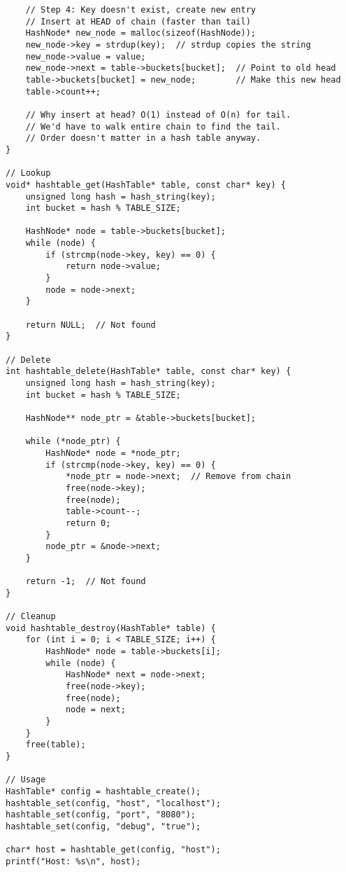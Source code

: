 \begin{lstlisting}
    // Step 4: Key doesn't exist, create new entry
    // Insert at HEAD of chain (faster than tail)
    HashNode* new_node = malloc(sizeof(HashNode));
    new_node->key = strdup(key);  // strdup copies the string
    new_node->value = value;
    new_node->next = table->buckets[bucket];  // Point to old head
    table->buckets[bucket] = new_node;        // Make this new head
    table->count++;

    // Why insert at head? O(1) instead of O(n) for tail.
    // We'd have to walk entire chain to find the tail.
    // Order doesn't matter in a hash table anyway.
}

// Lookup
void* hashtable_get(HashTable* table, const char* key) {
    unsigned long hash = hash_string(key);
    int bucket = hash % TABLE_SIZE;

    HashNode* node = table->buckets[bucket];
    while (node) {
        if (strcmp(node->key, key) == 0) {
            return node->value;
        }
        node = node->next;
    }

    return NULL;  // Not found
}

// Delete
int hashtable_delete(HashTable* table, const char* key) {
    unsigned long hash = hash_string(key);
    int bucket = hash % TABLE_SIZE;

    HashNode** node_ptr = &table->buckets[bucket];

    while (*node_ptr) {
        HashNode* node = *node_ptr;
        if (strcmp(node->key, key) == 0) {
            *node_ptr = node->next;  // Remove from chain
            free(node->key);
            free(node);
            table->count--;
            return 0;
        }
        node_ptr = &node->next;
    }

    return -1;  // Not found
}

// Cleanup
void hashtable_destroy(HashTable* table) {
    for (int i = 0; i < TABLE_SIZE; i++) {
        HashNode* node = table->buckets[i];
        while (node) {
            HashNode* next = node->next;
            free(node->key);
            free(node);
            node = next;
        }
    }
    free(table);
}

// Usage
HashTable* config = hashtable_create();
hashtable_set(config, "host", "localhost");
hashtable_set(config, "port", "8080");
hashtable_set(config, "debug", "true");

char* host = hashtable_get(config, "host");
printf("Host: %s\n", host);
\end{lstlisting}


